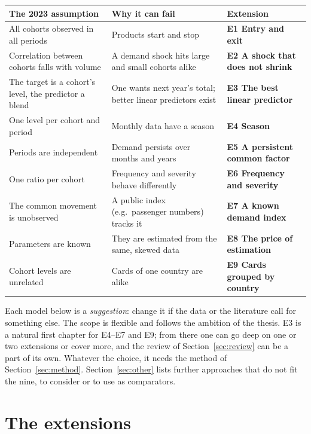 \documentclass[10pt]{article}
\newcommand{\rowsep}{\specialrule{0.2pt}{3pt}{3pt}}
\begin{document}
\begin{center}\small
\begin{tabular}{>{\raggedright}p{4.9cm} >{\raggedright}p{5.4cm} >{\raggedright\arraybackslash}p{4.4cm}}
  \toprule
  \textbf{The 2023 assumption} & \textbf{Why it can fail} & \textbf{Extension} \\
  \midrule
  All cohorts observed in all periods & Products start and stop & \textbf{E1 Entry and exit} \\ \rowsep
  Correlation between cohorts falls with volume & A demand shock hits large and small cohorts alike & \textbf{E2 A shock that does not shrink} \\ \rowsep
  The target is a cohort's level, the predictor a blend & One wants next year's total; better linear predictors exist & \textbf{E3 The best linear predictor} \\ \rowsep
  One level per cohort and period & Monthly data have a season & \textbf{E4 Season} \\ \rowsep
  Periods are independent & Demand persists over months and years & \textbf{E5 A persistent common factor} \\ \rowsep
  One ratio per cohort & Frequency and severity behave differently & \textbf{E6 Frequency and severity} \\ \rowsep
  The common movement is unobserved & A public index (e.g.\ passenger numbers) tracks it & \textbf{E7 A known demand index} \\ \rowsep
  Parameters are known & They are estimated from the same, skewed data & \textbf{E8 The price of estimation} \\ \rowsep
  Cohort levels are unrelated & Cards of one country are alike & \textbf{E9 Cards grouped by country} \\
  \bottomrule
\end{tabular}
\end{center}

Each model below is a \emph{suggestion}: change it if the data or the literature call for
something else. The scope is flexible and follows the ambition of the thesis. E3 is a natural
first chapter for E4--E7 and E9; from there one can go deep on one or two extensions or cover more,
and the review of Section~\ref{sec:review} can be a part of its own. Whatever the choice, it needs
the method of Section~\ref{sec:method}. Section~\ref{sec:other} lists further approaches that do not
fit the nine, to consider or to use as comparators.

\section{The extensions}
\end{document}
